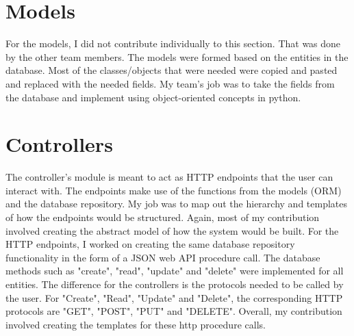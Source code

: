 \documentclass{article}
\begin{document}
\section{Models }
For the models, I did not contribute individually to this section. That was done by the other team members. The models were formed based on the entities in the database. Most of the classes/objects that were needed were copied and pasted and replaced with the needed fields. My team's job was to take the fields from the database and implement using object-oriented concepts in python. 
 
\section{Controllers }
The controller's module is meant to act as HTTP endpoints that the user can interact with. The endpoints make use of the functions from the models (ORM) and the database repository. My job was to map out the hierarchy and templates of how the endpoints would be structured. Again, most of my contribution involved creating the abstract model of how the system would be built. For the HTTP endpoints, I worked on creating the same database repository functionality in the form of a JSON web API procedure call. The database methods such as "create", "read", "update" and "delete" were implemented for all entities. The difference for the controllers is the protocols needed to be called by the user. For "Create", "Read", "Update" and "Delete", the corresponding HTTP protocols are "GET", "POST", "PUT" and "DELETE". Overall, my contribution involved creating the templates for these http procedure calls.  
\end{document}
